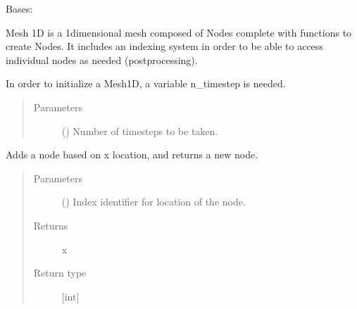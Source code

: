 \documentclass[letterpaper,10pt,english]{sphinxmanual}
\begin{document}
\begin{fulllineitems}
\label{\detokenize{mesh:mesh.Mesh1D}}
\sphinxAtStartPar
Bases: 

\sphinxAtStartPar
Mesh 1D is a 1\sphinxhyphen{}dimensional mesh composed of Nodes complete with
functions to create Nodes. It includes an indexing system in order
to be able to access individual nodes as needed (post\sphinxhyphen{}processing).

\sphinxAtStartPar
In order to initialize a Mesh1D, a variable n\_timestep is needed.
\begin{quote}\begin{description}
\item[{Parameters}] \leavevmode
\sphinxAtStartPar
{} (\sphinxstyleliteralemphasis{\sphinxupquote{{[}}}\sphinxstyleliteralemphasis{\sphinxupquote{{]}}}) \textendash{} Number of timesteps to be taken.

\end{description}\end{quote}

\begin{fulllineitems}
\label{\detokenize{mesh:mesh.Mesh1D.add_node}}
\sphinxAtStartPar
Adds a node based on x location, and returns a new node.
\begin{quote}\begin{description}
\item[{Parameters}] \leavevmode
\sphinxAtStartPar
{} (\sphinxstyleliteralemphasis{\sphinxupquote{{[}}}\sphinxstyleliteralemphasis{\sphinxupquote{{]}}}) \textendash{} Index identifier for location of the node.

\item[{Returns}] \leavevmode
\sphinxAtStartPar
x

\item[{Return type}] \leavevmode
\sphinxAtStartPar
{[}int{]}

\end{description}\end{quote}


\end{fulllineitems}
\end{fulllineitems}
\end{document}
